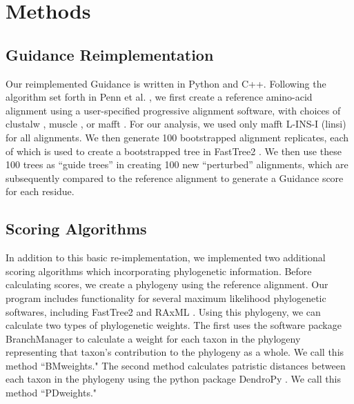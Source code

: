 \documentclass[12pt]{article}
\begin{document}
\section*{Methods}

\subsection*{Guidance Reimplementation}
Our reimplemented Guidance is written in Python and C++. Following the algorithm set forth in Penn et al. \citep{Penn2010}, we first create a reference amino-acid alignment using a user-specified progressive alignment software, with choices of clustalw \citep{Thompson1994}, muscle \citep{Edgar2004}, or mafft \citep{Katoh2002, Katoh2005}. For our analysis, we used only mafft L-INS-I (linsi) for all alignments. We then generate 100 bootstrapped alignment replicates, each of which is used to create a bootstrapped tree in FastTree2 \citep{Price2010}. We then use these 100 trees as “guide trees” in creating 100 new “perturbed” alignments, which are subsequently compared to the reference alignment to generate a Guidance score for each residue.

\subsection*{Scoring Algorithms}
In addition to this basic re-implementation, we implemented two additional scoring algorithms which incorporating phylogenetic information. Before calculating scores, we create a phylogeny using the reference alignment. Our program includes functionality for several maximum likelihood phylogenetic softwares, including FastTree2 \citep{Price2010} and RAxML \citep{Stamatakis2006}. Using this phylogeny, we can calculate two types of phylogenetic weights. The first uses the software package BranchManager \citep{Stone2007} to calculate a weight for each taxon in the phylogeny representing that taxon's contribution to the phylogeny as a whole. We call this method ``BMweights." The second method calculates patristic distances between each taxon in the phylogeny using the python package DendroPy \citep{Sukumaran2010}. We call this method ``PDweights."
\end{document}
